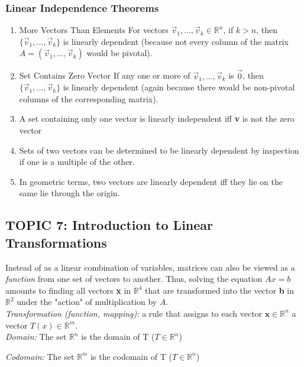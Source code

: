\documentclass[12pt]{article} %
\newcommand{\R}{\mathbb{R}}
\begin{document}
\subsubsection{Linear Independence Theorems}
\begin{enumerate}
	\item More Vectors Than Elements
		\indent For vectors $\vec{v}_1, ..., \vec{v}_k \in \R^n$, if $k > n$, then $\{\vec{v}_1, ..., \vec{v}_k\}$ is linearly dependent (because not every column of the matrix $A = (\vec{v}_1, ..., \vec{v}_k)$ would be pivotal). 
	\item Set Contains Zero Vector
		\indent If any one or more of $\vec{v}_1, ..., \vec{v}_k$ is $\vec{0}$, then $\{\vec{v}_1, ..., \vec{v}_k\}$ is linearly dependent (again because there would be non-pivotal columns of the corresponding matrix).
	\item A set containing only one vector is linearly independent iff \textbf{v} is not the zero vector
	\item Sets of two vectors can be determined to be linearly dependent by inspection if one is a multiple of the other.
	\item In geometric terms, two vectors are linearly dependent iff they lie on the same lie through the origin.
\end{enumerate}

\pagebreak
\subsection{TOPIC 7: Introduction to Linear Transformations}
Instead of as a linear combination of variables, matrices can also be viewed as a \emph{function} from one set of vectors to another. Thus, solving the equation $Ax=b$ amounts to finding all vectors \textbf{x} in $\R^4$ that are transformed into the vector \textbf{b} in $\R^2$ under the "action" of multiplication by $A$.\\ 

\emph{Transformation (function, mapping):} a rule that assigns to each vector $\mathbf{x} \in \R^n$ a vector $T(x) \in \R^m$. \\

\emph{Domain:} The set $\R^n$ is the domain of T ($T \in \R^n$)

\emph{Codomain:} The set $\R^m$ is the codomain of T ($T \in \R^n$)\\
\end{document}
